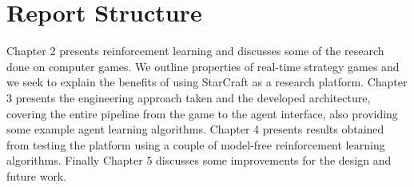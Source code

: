 \section{Report Structure}

Chapter 2 presents reinforcement learning and discusses some of the research
done on computer games. We outline properties of real-time strategy games and we
seek to explain the benefits of using StarCraft as a research platform. Chapter
3 presents the engineering approach taken and the developed architecture,
covering the entire pipeline from the game to the agent interface, also
providing some example agent learning algorithms. Chapter 4 presents results
obtained from testing the platform using a couple of model-free reinforcement
learning algorithms. Finally Chapter 5 discusses some improvements for the
design and future work.
